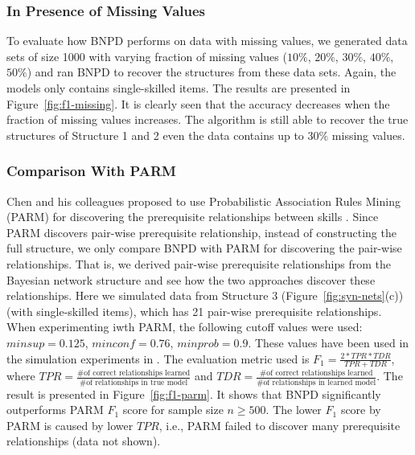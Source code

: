 \documentclass{edm_template}
\begin{document}
{	\subsubsection{In Presence of Missing Values}
	To evaluate how BNPD performs on data with missing values, we generated data sets of size 1000 with varying fraction of missing values ($10\%$, $20\%$, $30\%$, $40\%$, $50\%$) and ran BNPD to recover the structures from these data sets. Again, the models only contains single-skilled items.  The results are presented in Figure~\ref{fig:f1-missing}.
	It is clearly seen that the accuracy decreases when the fraction of missing values increases. 
	The algorithm is still able to recover the true structures of Structure 1 and 2 even the data contains up to $30\%$ missing values. 
	
	\subsubsection{Comparison With PARM}
	Chen and his colleagues proposed to use Probabilistic Association Rules Mining (PARM) for discovering the prerequisite relationships between skills \cite{chen2015discovering}.
	Since PARM discovers pair-wise prerequisite relationship, instead of constructing the full structure,
	we only compare BNPD with PARM for discovering the pair-wise relationships.
	That is, we derived pair-wise prerequisite relationships from the Bayesian network structure and see how the two approaches discover these relationships.
	Here we simulated data from Structure 3 (Figure~\ref{fig:syn-nets}(c)) (with single-skilled items), which has 21 pair-wise prerequisite relationships.
	When experimenting iwth PARM, the following cutoff values were used: $ minsup=0.125$, $minconf=0.76$, $minprob=0.9$. 
	These values have been used in the simulation experiments in \cite{chen2015discovering}.
	The evaluation metric used is $F_1=\frac{2*TPR*TDR}{TPR+TDR}$, where $TPR=\frac{\text{\# of correct relationships learned}}{\text{\# of relationships in true model}}$
	and $TDR=\frac{\text{\# of correct relationships learned}}{\text{\# of relationships in learned model}}$.
	The result is presented in Figure~\ref{fig:f1-parm}. It shows that BNPD significantly outperforms PARM $F_1$ score for sample size $n\ge 500$.
	The lower $F_1$ score by PARM is caused by lower $TPR$, i.e., PARM failed to discover many prerequisite relationships (data not shown).
	
}
\end{document}

